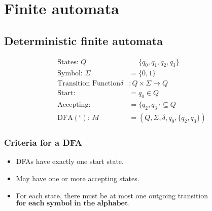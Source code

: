 \documentclass{article}
\begin{document}
\section{Finite automata}

\subsection{Deterministic finite automata}

\begin{align*}
    \text{States: } Q                 & = \{q_0, q_1, q_2, q_3\}                 \\
    \text{Symbol: } \Sigma            & = \{0, 1\}                               \\
    \text{Transition Function} \delta & : Q \times \Sigma \rightarrow Q          \\
    \text{Start: }                    & = q_0 \in Q                              \\
    \text{Accepting: }                & = \{q_2, q_3\} \subseteq Q               \\
    \text{DFA$(^\epsilon)$: } M       & = (Q, \Sigma, \delta, q_0, \{q_2, q_3\})
\end{align*}



\subsubsection{Criteria for a DFA}

\begin{itemize}
    \item DFAs have exactly one start state.
    \item May have one or more accepting states.
    \item For each state, there must be at most one outgoing transition $\textbf{for each symbol in the alphabet.}$
\end{itemize}
\end{document}
